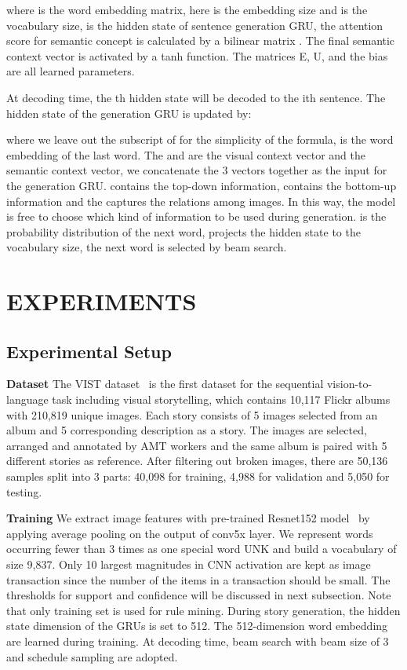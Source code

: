 \documentclass[sigconf]{acmart}
\begin{document}
where  is the word embedding matrix, here  is the embedding size and  is the vocabulary size,  is the hidden state of sentence generation GRU, the attention score  for semantic concept  is calculated by a bilinear matrix . The final semantic context vector is activated by a tanh function. The matrices E, U,  and the bias  are all learned parameters.

At decoding time, the th hidden state will be decoded to the ith sentence. The hidden state of the generation GRU is updated by:

where we leave out the subscript of  for the simplicity of the formula,  is the word embedding of the last word. The  and  are the visual context vector and the semantic context vector, we concatenate the 3 vectors together as the input for the generation GRU.  contains the top-down information,  contains the bottom-up information and the  captures the relations among images. In this way, the model is free to choose which kind of information to be used during generation.  is the probability distribution of the next word,  projects the hidden state to the vocabulary size, the next word is selected by beam search.

\section{EXPERIMENTS}
\subsection{Experimental Setup}

\textbf{Dataset} The VIST dataset~\cite{huang2016visual} is the first dataset for the sequential vision-to-language task including visual storytelling, which contains 10,117 Flickr albums with 210,819 unique images. Each story consists of 5 images selected from an album and 5 corresponding description as a story. The images are selected, arranged and annotated by AMT workers and the same album is paired with 5 different stories as reference. After filtering out broken images, there are 50,136 samples split into 3 parts: 40,098 for training, 4,988 for validation and 5,050 for testing.

\textbf{Training} We extract image features with pre-trained Resnet152 model~\cite{he2016deep} by applying average pooling on the output of conv5x layer.  We represent words occurring fewer than 3 times as one special word UNK and build a vocabulary of size 9,837. Only 10 largest magnitudes in CNN activation are kept as image transaction since the number of the items in a transaction should be small. The thresholds for support and confidence will be discussed in next subsection. Note that only training set is used for rule mining. During story generation, the hidden state dimension of the GRUs is set to 512. The 512-dimension word embedding are learned during training. At decoding time, beam search with beam size of 3 and schedule sampling\cite{bengio2015scheduled} are adopted.
\end{document}
